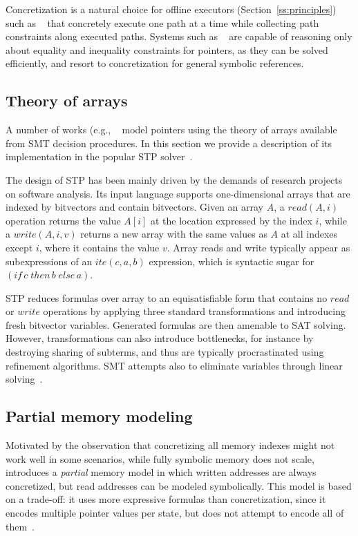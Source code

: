 Concretization is a natural choice for offline executors (Section~\ref{ss:principles}) such as ~\cite{DART-PLDI05,SAGE-NDSS08} that concretely execute one path at a time while collecting path constraints along executed paths. Systems such as ~\cite{CREST-ASE08,CUTE-FSE13} are capable of reasoning only about equality and inequality constraints for pointers, as they can be solved efficiently, and resort to concretization for general symbolic references.



\subsection{Theory of arrays}
\label{ss:theory-arrays}
A number of works (e.g., ~\cite{EXE-CCS06,KLEE-OSDI08,SAGE-NDSS08} model pointers using the theory of arrays available from SMT decision procedures. In this section we provide a description of its implementation in the popular STP solver~\cite{STP-CAV07}.

The design of STP has been mainly driven by the demands of research projects on software analysis. Its input language supports one-dimensional arrays that are indexed by bitvectors and contain bitvectors. Given an array $A$, a $read(A,i)$ operation returns the value $A[i]$ at the location expressed by the index $i$, while a $write(A,i,v)$ returns a new array with the same values as $A$ at all indexes except $i$, where it contains the value $v$. Array reads and write typically appear as subexpressions of an $ite(c,a,b)$ expression, which is syntactic sugar for $(if\,c\;then\,b\;else\,a)$.

STP reduces formulas over array to an equisatisfiable form that contains no $read$ or $write$ operations by applying three standard transformations and introducing fresh bitvector variables. Generated formulas are then amenable to SAT solving. However, transformations can also introduce bottlenecks, for instance by destroying sharing of subterms, and thus are typically procrastinated using refinement algorithms. SMT attempts also to eliminate variables through linear solving~\cite{STP-CAV07}.

\subsection{Partial memory modeling}
\label{ss:index-based-memory}
Motivated by the observation that concretizing all memory indexes might not work well in some scenarios, while fully symbolic memory does not scale, ~\cite{MAYHEM-SP12} introduces a {\em partial} memory model in which written addresses are always concretized, but read addresses can be modeled symbolically. This model is based on a trade-off: it uses more expressive formulas than concretization, since it encodes multiple pointer values per state, but does not attempt to encode all of them~\cite{MAYHEM-THESIS}. %

